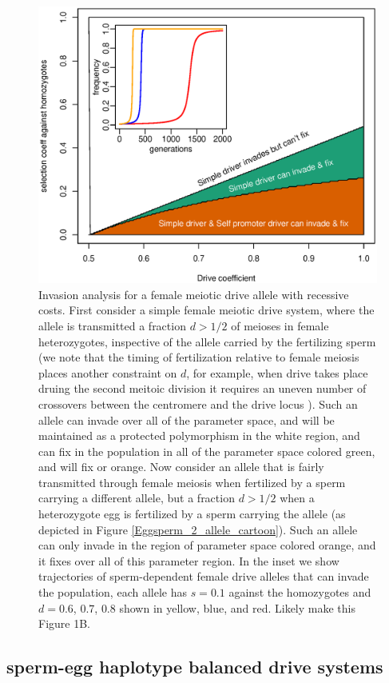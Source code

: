 \documentclass[12pt,letterpaper]{article}
\newcommand{\gc}[1]{{ \color{red} #1}}
\begin{document}
\begin{figure}
\includegraphics[width = 0.8 \textwidth]{Figures/invasion_space_recessive_driver.eps}
\caption{Invasion analysis for a female meiotic drive allele with
  recessive costs. First consider a simple female meiotic
  drive system, where the allele is transmitted a fraction $d>1/2$ of
  meioses in female heterozygotes, inspective
  of the allele carried by the fertilizing sperm (we note that the timing of fertilization relative to female meiosis places another constraint on $d$, for example, when drive takes place druing the second meitoic division
	it requires an uneven number of crossovers between the centromere and the drive locus \citep[see ][ for discussion]{Buckler1999}). 
Such an allele can invade over all of the parameter space, and will be maintained as a
  protected polymorphism in the white region, and can fix in the
  population in all of the parameter space colored green,
  and will fix  or orange. Now consider an allele that is fairly transmitted through
  female meiosis when fertilized by a sperm carrying a different
  allele, but a fraction $d>1/2$ when a heterozygote egg is fertilized
  by a sperm carrying the allele (as depicted in Figure
  \ref{Eggsperm_2_allele_cartoon}). Such an allele can only invade in
  the region of parameter space colored orange, and it fixes over all
  of this parameter region. 
 In the inset we show trajectories of sperm-dependent female drive
 alleles that can invade the population, each allele has $s =0.1$ against the
 homozygotes and $d =0.6$, $0.7$, $0.8$ shown in yellow, blue, and red. 
 \gc{Likely make this Figure 1B.} } \label{Invasion_space}
\end{figure}


\subsection*{ sperm-egg haplotype balanced drive systems}
\end{document}
